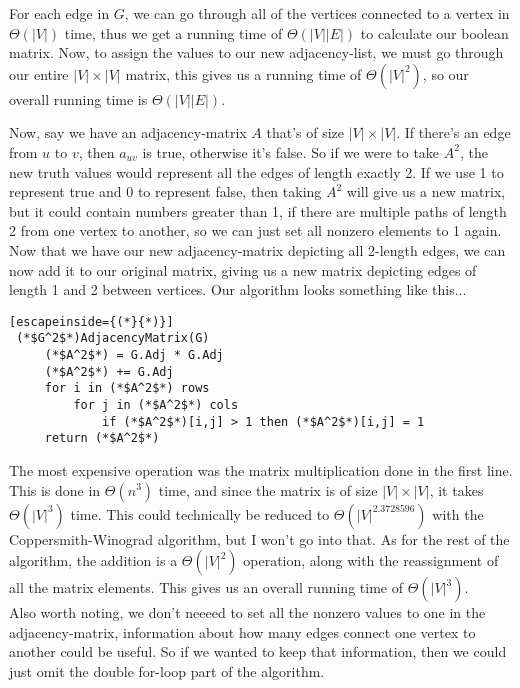 \documentclass[11pt]{article}
\def \n {\par \vspace{\baselineskip}}
\begin{document}
 \n
 For each edge in $G$, we can go through all of the vertices connected to a vertex in $\Theta(|V|)$ 
 time, thus we get a running time of $\Theta(|V||E|)$ to calculate our boolean matrix. Now, to 
 assign the values to our new adjacency-list, we must go through our entire $|V| \times |V|$ matrix, 
 this gives us a running time of $\Theta(|V|^2)$, so our overall running time is $\Theta(|V||E|)$.

 \newpage
 Now, say we have an adjacency-matrix $A$ that's of size \(|V| \times |V|\).  If there's an edge from 
 $u$ to $v$, then $a_{uv}$ is true, otherwise it's false.  So if we were to take $A^2$, the new truth 
 values would represent all the edges of length exactly 2.  If we use 1 to represent true and 0 to 
 represent false, then taking $A^2$ will give us a new matrix, but it could contain numbers greater 
 than 1, if there are multiple paths of length 2 from one vertex to another, so we can just set all 
 nonzero elements to 1 again. \\

 Now that we have our new adjacency-matrix depicting all 2-length edges, we can now add it to our 
 original matrix, giving us a new matrix depicting edges of length 1 and 2 between vertices.  Our 
 algorithm looks something like this... \\

 \begin{lstlisting}[escapeinside={(*}{*)}]
 (*$G^2$*)AdjacencyMatrix(G)
     (*$A^2$*) = G.Adj * G.Adj 
     (*$A^2$*) += G.Adj 
     for i in (*$A^2$*) rows
         for j in (*$A^2$*) cols 
             if (*$A^2$*)[i,j] > 1 then (*$A^2$*)[i,j] = 1
     return (*$A^2$*)
 \end{lstlisting}

 \n 
 The most expensive operation was the matrix multiplication done in the first line.  This is done 
 in $\Theta(n^3)$ time, and since the matrix is of size \(|V| \times |V|\), it takes  $\Theta(|V|^3)$ 
 time.  This could technically be reduced to $\Theta(|V|^{2.3728596})$ with the Coppersmith-Winograd 
 algorithm, but I won't go into that.  As for the rest of the algorithm, the addition is a 
 \(\Theta(|V|^2)\) operation, along with the reassignment of all the matrix elements.  This gives us 
 an overall running time of \(\Theta(|V|^3)\). \\

 Also worth noting, we don't neeeed to set all the nonzero values to one in the adjacency-matrix, 
 information about how many edges connect one vertex to another could be useful.  So if we wanted to 
 keep that information, then we could just omit the double for-loop part of the algorithm.
\end{document}
